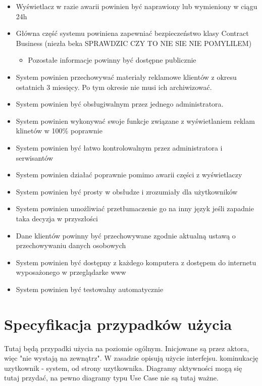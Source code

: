 \documentclass[10pt,a4paper,titlepage]{article} %
\begin{document}
\begin{enumerate}
				\begin{itemize}
					\item Wyświetlacz w razie awarii powinien być naprawiony lub wymieniony w
					ciągu 24h
					\item Główna część systemu powiniena zapewniać bezpieczeństwo klasy
					  Contract Business (niezła beka SPRAWDZIC CZY TO NIE SIE NIE POMYLILEM)
						 \begin{itemize}
					      \item Pozostałe informacje powinny być dostępne publicznie
					     \end{itemize}
					\item System powinien przechowywać materiały reklamowe klientów z okresu
					    ostatnich 3 miesięcy. Po tym okresie nie musi ich archiwizować.
					\item System powinien być obsługiwalnym przez jednego administratora.
					\item System powinien wykonywać swoje funkcje związane z wyświetlaniem
					    reklam klinetów w 100\% poprawnie
					\item System powinien być łatwo kontrolowalnym przez administratora i
						 serwisantów
					\item System powinien działać poprawnie pomimo awarii części z
						  wyświetlaczy
					\item System powinien być prosty w obsłudze i zrozumiały dla użytkowników
					\item System powinien umożliwiać przetłumaczenie go na inny język jeśli
					     zapadnie taka decyzja w przyszłości
					\item Dane klientów powinny być przechowywane zgodnie aktualną ustawą o
					     przechowywaniu danych osobowych
					\item System powinien być dostępny z każdego komputera z dostępem do
					     internetu wyposażonego w przeglądarke www
					\item System powinien być testowalny automatycznie
				\end{itemize}
		   \end{enumerate}
		  
	
	
	\section{Specyfikacja przypadków użycia}	
	
		Tutaj będą przypadki użycia na poziomie ogólnym. Inicjowane są przez aktora, więc "nie wystają na zewnątrz". W zasadzie opisują użycie interfejsu. kominukację uzytkownik - system, od strony uzytkownika.\newline
		Diagramy aktywności mogą się tutaj przydać, na pewno diagramy typu Use Case nie są tutaj ważne.\newline
\end{document}
